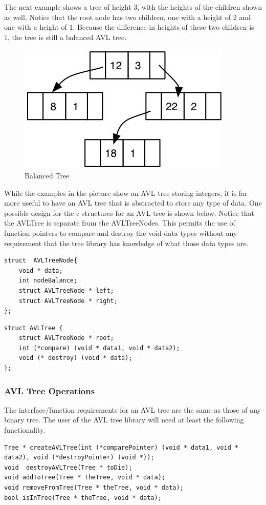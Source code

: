 The next example shows a tree of height 3, with the heights of the children shown as well. Notice that the root node has two children, one with a height of 2 and one with a height of 1. Because the difference in heights of these two children is 1, the tree is still a balanced AVL tree.

\begin{figure}[H]
\centering
\includegraphics{pictures/tree14.png}
\caption{Balanced Tree}
\label{fig:tree14}
\end{figure}

While the examples in the picture show an AVL tree storing integers, it is far more useful to have an AVL tree that is abstracted to store any type of data. One possible design for the c structures for an AVL tree is shown below. Notice that the AVLTree is separate from the AVLTreeNodes. This permits the use of function pointers to compare and destroy the void data types without any requirement that the tree library has knowledge of what those data types are.  


\begin{lstlisting}
struct  AVLTreeNode{
    void * data;
    int nodeBalance;
    struct AVLTreeNode * left;
    struct AVLTreeNode * right;
};\end{lstlisting}


\begin{lstlisting}
struct AVLTree {
    struct AVLTreeNode * root;
    int (*compare) (void * data1, void * data2);
    void (* destroy) (void * data);
};\end{lstlisting}


\subsubsection{AVL Tree Operations}

The interface/function requirements for an AVL tree are the same as those of any binary tree. The user of the AVL tree library will need at least the following functionality.
\begin{lstlisting}
Tree * createAVLTree(int (*comparePointer) (void * data1, void * data2), void (*destroyPointer) (void *));
void  destroyAVLTree(Tree * toDie);
void addToTree(Tree * theTree, void * data);
void removeFromTree(Tree * theTree, void * data);
bool isInTree(Tree * theTree, void * data);

\end{lstlisting}

